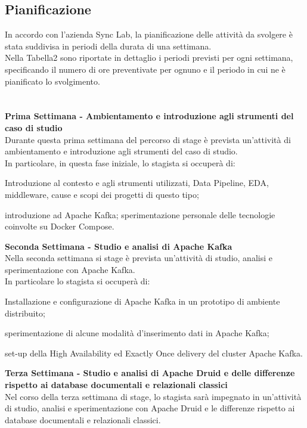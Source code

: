 \subsection{Pianificazione}
In accordo con l'azienda Sync Lab, la pianificazione delle attività da svolgere è stata suddivisa in periodi della durata di una settimana. \\
Nella Tabella2 sono riportate in dettaglio i periodi previsti per ogni settimana, specificando il numero di ore preventivate per ognuno e il periodo in cui ne è pianificato lo svolgimento.
\\
\\
\\
\textbf{Prima Settimana - Ambientamento e introduzione agli strumenti del caso di studio}\\
Durante questa prima settimana del percorso di stage è prevista un'attività di ambientamento e introduzione agli strumenti del caso di studio. \\
In particolare, in questa fase iniziale, lo stagista si occuperà di:
\begin{list}{*}{}
    \item Introduzione al contesto e agli strumenti utilizzati, \gls{Data Pipeline}{}, EDA, middleware, cause e
    scopi dei progetti di questo tipo;
    \item introduzione ad Apache Kafka; sperimentazione personale delle tecnologie coinvolte su Docker
    Compose.
\end{list} 
\pagebreak
\textbf{Seconda Settimana - Studio e analisi di Apache Kafka}\\
Nella seconda settimana si stage è prevista un'attività di studio, analisi e sperimentazione con Apache Kafka. \\
In particolare lo stagista si occuperà di:
\begin{list}{*}{}
    \item Installazione e configurazione di Apache Kafka in un prototipo di ambiente distribuito;
    \item sperimentazione di alcune modalità d'inserimento dati in Apache Kafka;
    \item set-up della High Availability ed Exactly Once delivery del cluster Apache Kafka.
\end{list}
\textbf{Terza Settimana - Studio e analisi di Apache Druid e delle differenze rispetto ai database
documentali e relazionali classici}\\
Nel corso della terza settimana di stage, lo stagista sarà impegnato in un'attività di studio, analisi e sperimentazione con Apache Druid e le differenze rispetto ai database documentali e relazionali classici. \\

